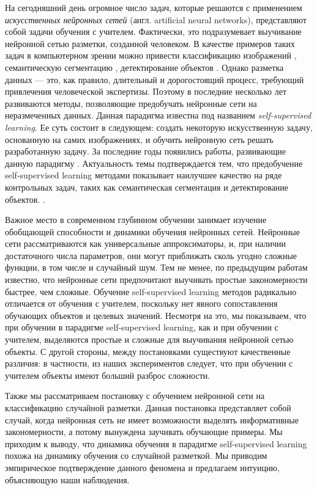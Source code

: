 На сегодняшний день огромное число задач, которые решаются с применением \textit{искусственных нейронных сетей} (англ. artificial neural networks), представляют собой задачи обучения с учителем. Фактически, это подразумевает выучивание нейронной сетью разметки, созданной человеком. В качестве примеров таких задач в компьютерном зрении можно привести классификацию изображений \cite{imagenet}, семантическую сегментацию \cite{cityscapes, pascalvoc}, детектирование объектов \cite{coco, pascalvoc}. Однако разметка данных --- это, как правило, длительный и дорогостоящий процесс, требующий привлечения человеческой экспертизы. Поэтому в последние несколько лет развиваются методы, позволяющие предобучать нейронные сети на неразмеченных данных. Данная парадигма известна под названием \textit{self-supervised learning}. Ее суть состоит в следующем: создать некоторую искусственную задачу, основанную на самих изображениях, и обучить нейронную сеть решать разработанную задачу. За последние годы появились работы, развивающие данную парадигму \cite{simclr, moco, byol, simsiam}. Актуальность темы подтверждается тем, что предобучение self-supervised learning методами показывает наилучшее качество на ряде контрольных задач, таких как семантическая сегментация и детектирование объектов. .

Важное место в современном глубинном обучении занимает изучение обобщающей способности и динамики обучения нейронных сетей. Нейронные сети рассматриваются как универсальные аппроксиматоры, и, при наличии достаточного числа параметров, они могут приближать сколь угодно сложные функции, в том числе и случайный шум. Тем не менее, по предыдущим работам \cite{memorization, spectralbias, frequency} известно, что нейронные сети предпочитают выучивать простые закономерности быстрее, чем сложные. Обучение self-supervised learning методов радикально отличается от обучения с учителем, поскольку нет явного сопоставления обучающих объектов и целевых значений. Несмотря на это, мы показываем, что при обучении в парадигме self-supervised learning, как и при обучении с учителем, выделяются простые и сложные для выучивания нейронной сетью объекты. С другой стороны, между постановками существуют качественные различия: в частности, из наших экспериментов следует, что при обучении с учителем объекты имеют больший разброс сложности.

Также мы рассматриваем постановку с обучением нейронной сети на классификацию случайной разметки. Данная постановка представляет собой случай, когда нейронная сеть не имеет возможности выделять информативные закономерности, а потому вынуждена заучивать обучающие примеры. Мы приходим к выводу, что динамика обучения в парадигме self-supervised learning похожа на динамику обучения со случайной разметкой. Мы приводим эмпирическое подтверждение данного феномена и предлагаем интуицию, объясняющую наши наблюдения.
